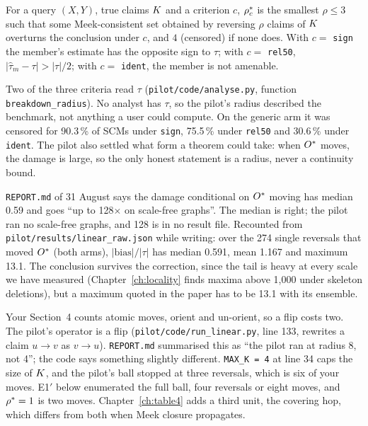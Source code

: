 \begin{definicao}
For a query $(X,Y)$, true claims $K$ and a criterion $c$, $\rho^{*}_c$ is the smallest
$\rho \le 3$ such that some Meek-consistent set obtained by reversing $\rho$ claims of $K$
overturns the conclusion under $c$, and $4$ (censored) if none does. With $c = $ \texttt{sign} the
member's estimate has the opposite sign to $\tau$; with $c = $ \texttt{rel50},
$|\hat\tau_m - \tau| > |\tau|/2$; with $c = $ \texttt{ident}, the member is not amenable.
\end{definicao}

Two of the three criteria read $\tau$ (\texttt{pilot/code/analyse.py}, function
\texttt{breakdown\_radius}). No analyst has $\tau$, so the pilot's radius described the benchmark,
not anything a user could compute. On the generic arm it was censored for 90.3\,\% of SCMs under
\texttt{sign}, 75.5\,\% under \texttt{rel50} and 30.6\,\% under \texttt{ident}. The pilot also
settled what form a theorem could take: when $O^{*}$ moves, the damage is large, so the only
honest statement is a radius, never a continuity bound.

\begin{armadilha}
\texttt{REPORT.md} of 31 August says the damage conditional on $O^{*}$ moving has median 0.59 and
goes ``up to 128$\times$ on scale-free graphs''. The median is right; the pilot ran no scale-free
graphs, and 128 is in no result file. Recounted from
\texttt{pilot/results/linear\_raw.json} while writing: over the 274 single reversals that moved
$O^{*}$ (both arms), $|\text{bias}|/|\tau|$ has median 0.591, mean 1.167 and maximum 13.1. The
conclusion survives the correction, since the tail is heavy at every scale we have measured
(Chapter~\ref{ch:locality} finds maxima above 1,000 under skeleton deletions), but a maximum
quoted in the paper has to be 13.1 with its ensemble.
\end{armadilha}

Your Section~4 counts atomic moves, orient and un-orient, so a flip costs two. The pilot's
operator is a flip (\texttt{pilot/code/run\_linear.py}, line 133, rewrites a claim $u \to v$ as
$v \to u$). \texttt{REPORT.md} summarised this as ``the pilot ran at radius 8, not 4''; the code
says something slightly different. \texttt{MAX\_K = 4} at line 34 caps the size of $K$, and the
pilot's ball stopped at three reversals, which is six of your moves. E1$'$ below enumerated the full
ball, four reversals or eight moves, and $\rho^{*} = 1$ is two moves. Chapter~\ref{ch:table4} adds a
third unit, the covering hop, which differs from both when Meek closure propagates.

